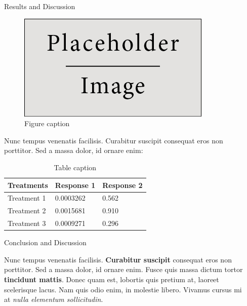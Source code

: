 \documentclass[final]{beamer}
\newlength{\sepwid}
\newlength{\onecolwid}
\begin{document}
\begin{frame}[t]
\begin{columns}[t]
\begin{column}{\sepwid}\end{column} %

\begin{column}{\onecolwid} %
	\begin{block}{Results and Discussion}
		
		\begin{figure}
			\includegraphics[width=0.8\linewidth]{placeholder.jpg}
			\caption{Figure caption}
		\end{figure}
		
		Nunc tempus venenatis facilisis. Curabitur suscipit consequat eros non porttitor. Sed a massa dolor, id ornare enim:
		
		\begin{table}
			\vspace{2ex}
			\begin{tabular}{l l l}
				\toprule
				\textbf{Treatments} & \textbf{Response 1} & \textbf{Response 2}\\
				\midrule
				Treatment 1 & 0.0003262 & 0.562 \\
				Treatment 2 & 0.0015681 & 0.910 \\
				Treatment 3 & 0.0009271 & 0.296 \\
				\bottomrule
			\end{tabular}
			\caption{Table caption}
		\end{table}
		
	\end{block}
	\begin{block}{Conclusion and Discussion}
		
		Nunc tempus venenatis facilisis. \textbf{Curabitur suscipit} consequat eros non porttitor. Sed a massa dolor, id ornare enim. Fusce quis massa dictum tortor \textbf{tincidunt mattis}. Donec quam est, lobortis quis pretium at, laoreet scelerisque lacus. Nam quis odio enim, in molestie libero. Vivamus cursus mi at \textit{nulla elementum sollicitudin}.
	\end{block}
	

\end{column}
\end{columns}
\end{frame}
\end{document}

